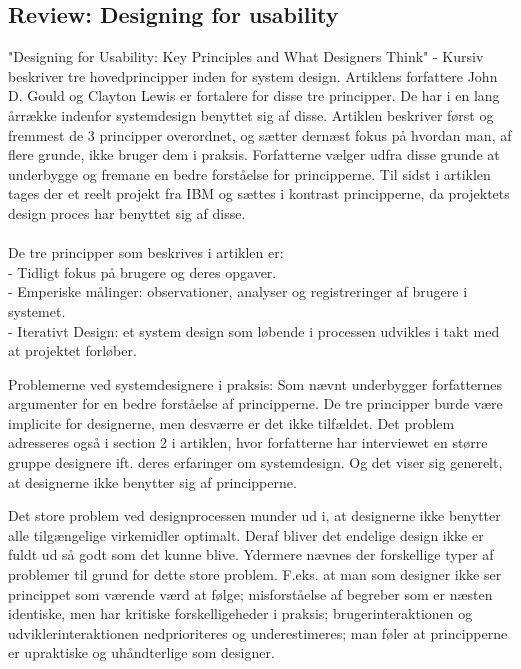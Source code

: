 \documentclass[a4paper,12pt]{article}
\begin{document}
\subsection{Review: Designing for usability}
"Designing for Usability: Key Principles and What Designers Think" - Kursiv
beskriver tre hovedprincipper inden for system design. Artiklens forfattere John D. Gould og Clayton Lewis er fortalere for disse tre principper. De har i en lang årrække indenfor systemdesign benyttet sig af disse.
Artiklen beskriver først og fremmest de 3 principper overordnet, og sætter dernæst fokus på hvordan man, af flere grunde, ikke bruger dem i praksis. Forfatterne vælger udfra disse grunde at underbygge og fremane en bedre forståelse for principperne. Til sidst i artiklen tages der et reelt projekt fra IBM og sættes i kontrast principperne, da projektets design proces har benyttet sig af disse.
\\
\\
De tre principper som beskrives i artiklen er:
\\
- Tidligt fokus på brugere og deres opgaver.
\\
- Emperiske målinger: observationer, analyser og registreringer af brugere i systemet.
\\
- Iterativt Design: et system design som løbende i processen udvikles i takt med at projektet forløber.\cite[side~300]{dfu}

Problemerne ved systemdesignere i praksis:
Som nævnt underbygger forfatternes argumenter for en bedre forståelse af principperne.
De tre principper burde være implicite for designerne, men desværre er det ikke tilfældet. Det problem adresseres også i section 2 i artiklen, hvor forfatterne har interviewet en større gruppe designere ift. deres erfaringer om systemdesign. Og det viser sig generelt, at designerne ikke benytter sig af principperne.\cite[side~301]{dfu}

Det store problem ved designprocessen munder ud i, at designerne ikke benytter alle tilgængelige virkemidler optimalt. Deraf bliver det endelige design ikke er fuldt ud så godt som det kunne blive. Ydermere nævnes der forskellige typer af problemer til grund for dette store problem. F.eks. at man som designer ikke ser princippet som værende værd at følge; misforståelse af begreber som er næsten identiske, men har kritiske forskelligeheder i praksis; brugerinteraktionen og udviklerinteraktionen nedprioriteres og underestimeres; man føler at principperne er upraktiske og uhåndterlige som designer. \cite[side~303]{dfu}
\end{document}
